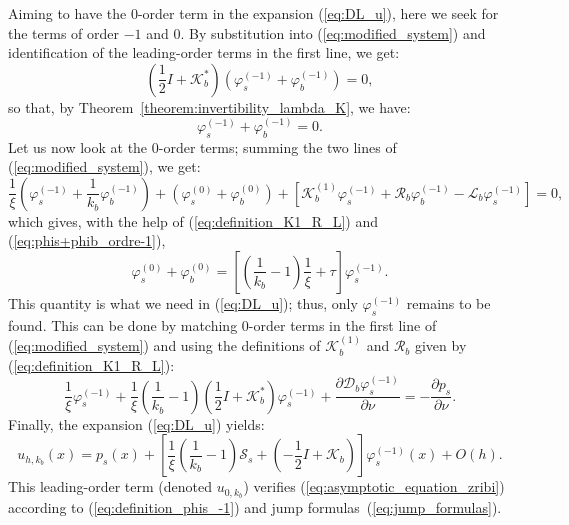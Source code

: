  Aiming to have the $0$-order term in the expansion (\ref{eq:DL_u}),
here we seek for the terms of order $-1$ and $0$. By substitution
into (\ref{eq:modified_system}) and identification of the leading-order
terms in the first line, we get:
\[
\left(\frac{1}{2}I+\mathcal{K}_{b}^{*}\right)\left(\varphi_{s}^{(-1)}+\varphi_{b}^{(-1)}\right)=0,
\]
 so that, by Theorem~\ref{theorem:invertibility_lambda_K}, we have:
\begin{equation}
\varphi_{s}^{(-1)}+\varphi_{b}^{(-1)}=0.\label{eq:phis+phib_ordre-1}
\end{equation}
 Let us now look at the $0$-order terms; summing the two lines of (\ref{eq:modified_system}), we
get:
\[
\frac{1}{\xi}\left(\varphi_{s}^{(-1)}+\frac{1}{k_{b}}\varphi_{b}^{(-1)}\right)+(\varphi_{s}^{(0)}+\varphi_{b}^{(0)})
+
\left[\mathcal{K}_{b}^{(1)}\varphi_{s}^{(-1)}+\mathcal{R}_{b}\varphi_{b}^{(-1)}-\mathcal{L}_{b}\varphi_{s}^{(-1)}\right]=0,
\]
 which gives, with the help of (\ref{eq:definition_K1_R_L}) and (\ref{eq:phis+phib_ordre-1}),
\begin{equation}
\varphi_{s}^{(0)}+\varphi_{b}^{(0)}=\left[\left(\frac{1}{k_{b}}-1\right)
\frac{1}{\xi}
+\tau\right]\varphi_{s}^{(-1)}.\label{eq:phis0+phib0}
\end{equation}
 This quantity is what we need in (\ref{eq:DL_u}); thus, only $\varphi_{s}^{(-1)}$
remains to be found. This can be done by matching $0$-order terms
in the first line of (\ref{eq:modified_system}) and using the
definitions of $\mathcal{K}_{b}^{(1)}$ and $\mathcal{R}_{b}$ given
by (\ref{eq:definition_K1_R_L}):
\begin{equation}
\frac{1}{\xi}\varphi_{s}^{(-1)}+\frac{1}{\xi}\left(\frac{1}{k_{b}}-1\right)\left(\frac{1}{2}I+\mathcal{K}_{b}^{*}\right)\varphi_{s}^{(-1)}+\frac{\partial\mathcal{D}_{b}\varphi_{s}^{(-1)}}{\partial\nu}=-\frac{\partial
p_s}{\partial\nu}.\label{eq:definition_phis_-1}
\end{equation}
 Finally, the expansion (\ref{eq:DL_u}) yields:
\begin{equation}
u_{h,k_{b}}(x)=p_s(x)+\left[\frac{1}{\xi}\left(\frac{1}{k_{b}}-1\right)\mathcal{S}_{s}+\left(-\frac{1}{2}I+\mathcal{K}_{b}\right)\right]\varphi_{s}^{(-1)}(x)+O(h).\label{eq:u_delta_sigma_ordre1}
\end{equation}
 This leading-order term (denoted $u_{0,k_{b}}$) verifies (\ref{eq:asymptotic_equation_zribi})
according to (\ref{eq:definition_phis_-1}) and jump formulas~(\ref{eq:jump_formulas}).

